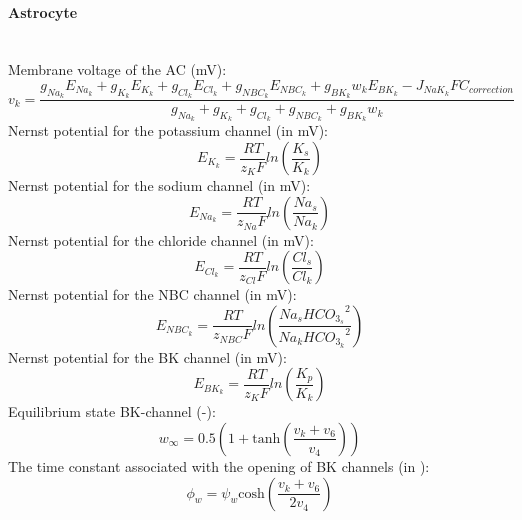 \paragraph{Astrocyte}~\\
%
Membrane voltage of the \gls{AC} (mV):
\begin{equation} \label{eq:v_k}
v_k=\frac{g_{Na_k}E_{Na_k}+g_{K_k}E_{K_k}+g_{Cl_k}E_{Cl_k}+g_{NBC_k}E_{NBC_k} + g_{BK_k}w_kE_{BK_k} -J_{NaK_k}F C_{correction} }{ g_{Na_k}+g_{K_k}+g_{Cl_k}+g_{NBC_k}+g_{BK_k}w_k }
\end{equation}
%
Nernst potential for the potassium channel (in mV):
\begin{equation} \label{eq:E_K}
E_{K_k}=\frac{RT}{z_K F}ln\left( \frac{K_s}{K_k}\right) 
\end{equation}
%
Nernst potential for the sodium channel (in mV):
\begin{equation} \label{eq:E_Na}
E_{Na_k}=\frac{RT}{z_{Na} F}ln\left( \frac{Na_s}{Na_k}\right) 
\end{equation}
%
Nernst potential for the chloride channel (in mV):
\begin{equation} \label{eq:E_Cl}
E_{Cl_k}=\frac{RT}{z_{Cl} F}ln\left( \frac{Cl_s}{Cl_k}\right) 
\end{equation}
%
Nernst potential for the NBC channel (in mV):
\begin{equation} \label{eq:E_NBC}
E_{NBC_k}=\frac{RT}{z_{NBC} F}ln\left( \frac{Na_s {HCO_{3_s}}^2}{Na_k {HCO_{3_k}}^2}\right) 
\end{equation}
Nernst potential for the BK channel (in mV):
\begin{equation} \label{eq:E_BK}
E_{BK_k}=\frac{RT}{z_K F}ln\left( \frac{K_p}{K_k}\right) 
\end{equation}
%
Equilibrium state BK-channel (-):
\begin{equation} \label{eq:winf}
w_{\infty}=0.5 \left(1+\mathrm{tanh}\left(\frac{v_{k}+v_{6} }{v_{4}} \right)  \right) 
\end{equation}
%
The time constant associated with the opening of BK channels	 (in \pers):
\begin{equation} \label{eq:phin}
\phi_{w}=\psi_{w}\mathrm{cosh}\left( \frac{v_{k}+v_{6}}{2v_{4}}\right) 
\end{equation}


